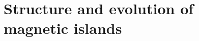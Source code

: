 %
% 
%
% 

\section{Structure and evolution of magnetic islands}
\label{sec:reconnection-plasmoids}

\begin{figure}[htb]

\end{figure}
